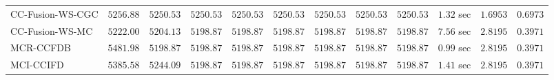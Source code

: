 \begin{table}[H]
\begin{tabular}{lrrrrrrrrrrr}
    CC-Fusion-WS-CGC & $      5256.88$ & $      5250.53$ & $      5250.53$ & $      5250.53$ & $      5250.53$ & $      5250.53$ & $      5250.53$ & $      5250.53$ & $         1.32$ sec    & $       1.6953$  & $       0.6973$ \\ 
     CC-Fusion-WS-MC & $      5222.00$ & $      5204.13$ & $      5198.87$ & $      5198.87$ & $      5198.87$ & $      5198.87$ & $      5198.87$ & $      5198.87$ & $         7.56$ sec    & $       2.8195$  & $       0.3971$ \\ 
\cmidrule{1-1} 
           MCR-CCFDB & $      5481.98$ & $      5198.87$ & $      5198.87$ & $      5198.87$ & $      5198.87$ & $      5198.87$ & $      5198.87$ & $      5198.87$ & $         0.99$ sec    & $       2.8195$  & $       0.3971$ \\ 
\cmidrule{1-1} 
           MCI-CCIFD & $      5385.58$ & $      5244.09$ & $      5198.87$ & $      5198.87$ & $      5198.87$ & $      5198.87$ & $      5198.87$ & $      5198.87$ & $         1.41$ sec    & $       2.8195$  & $       0.3971$ \\ 
\bottomrule
\end{tabular}
\end{table}


